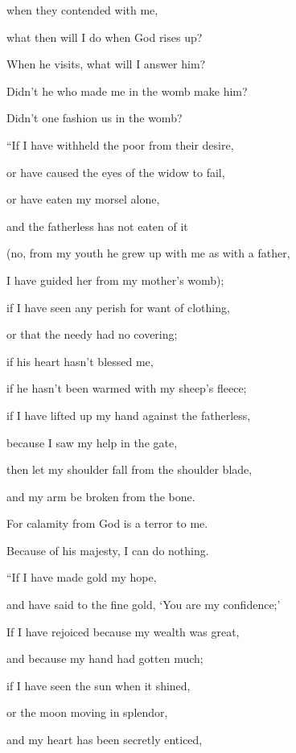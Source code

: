 {\par }{\QB when they contended with me,
\par }{\Q {}what then will I do when God rises up?
\par }{\QB When he visits, what will I answer him?
\par }{\Q {}Didn’t he who made me in the womb make him?
\par }{\QB Didn’t one fashion us in the womb?
\par }{\Q {}“If I have withheld the poor from their desire,
\par }{\QB or have caused the eyes of the widow to fail,
\par }{\Q {}or have eaten my morsel alone,
\par }{\QB and the fatherless has not eaten of it
\par }{\Q {}(no, from my youth he grew up with me as with a father,
\par }{\QB I have guided her from my mother’s womb);
\par }{\Q {}if I have seen any perish for want of clothing,
\par }{\QB or that the needy had no covering;
\par }{\Q {}if his heart hasn’t blessed me,
\par }{\QB if he hasn’t been warmed with my sheep’s fleece;
\par }{\Q {}if I have lifted up my hand against the fatherless,
\par }{\QB because I saw my help in the gate,
\par }{\Q {}then let my shoulder fall from the shoulder blade,
\par }{\QB and my arm be broken from the bone.
\par }{\Q {}For calamity from God is a terror to me.
\par }{\QB Because of his majesty, I can do nothing.
\par }{\Q {}“If I have made gold my hope,
\par }{\QB and have said to the fine gold, ‘You are my confidence;’
\par }{\Q {}If I have rejoiced because my wealth was great,
\par }{\QB and because my hand had gotten much;
\par }{\Q {}if I have seen the sun when it shined,
\par }{\QB or the moon moving in splendor,
\par }{\Q {}and my heart has been secretly enticed,
}
